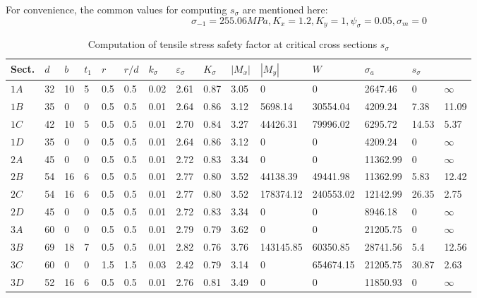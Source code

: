 \begin{landscape}
	For convenience, the common values for computing $ s_\sigma $ are mentioned here:
	\[
	\sigma_{-1} = 255.06 \unit{MPa}, K_x = 1.2, K_y = 1, \psi_\sigma = 0.05, \sigma_m = 0
	\]
	\begin{table}[ht]
		\renewcommand{\arraystretch}{1.5}
		\centering
		\caption{Computation of tensile stress safety factor at critical cross sections $ s_\sigma $}
		\begin{tabular}{lllllllllllllll}\toprule
			Sect. 	& $ d $ & $ b $ & $ t_1 $ & $ r $ & $ r/d $ & $ k_\sigma $ & $ \varepsilon_\sigma $ & $ K_\sigma $ & $ |M_x| $ & $ |M_y| $ & $ W $ & $ \sigma_a $ & $ s_\sigma $ \\ \midrule
			$ 1A $	&	32	&	10	&	5	&	0.5 & 0.5 &  0.02	&	2.61	&	0.87	&	3.05	&	0			&	0			&	2647.46		&	0			&	 $ \infty $	\\
			$ 1B $	&	35	&	0	&	0	&	0.5 & 0.5 &  0.01	&	2.64	&	0.86	&	3.12	&	5698.14		&	30554.04	&	4209.24		&	7.38		&	11.09		\\
			$ 1C $	&	42	&	10	&	5	&	0.5 & 0.5 &  0.01	&	2.70	&	0.84	&	3.27	&	44426.31	&	79996.02	&	6295.72		&	14.53		&	5.37		\\
			$ 1D $	&	35	&	0	&	0	&	0.5 & 0.5 &  0.01	&	2.64	&	0.86	&	3.12	&	0			&	0			&	4209.24		&	0			&	$ \infty $	\\
			$ 2A $	&	45	&	0	&	0	&	0.5 & 0.5 &  0.01	&	2.72	&	0.83	&	3.34	&	0			&	0			&	11362.99	&	0			&	$ \infty $	\\
			$ 2B $	&	54	&	16	&	6	&	0.5 & 0.5 &  0.01	&	2.77	&	0.80	&	3.52	&	44138.39	&	49441.98	&	11362.99	&	5.83		&	12.42		\\
			$ 2C $	&	54	&	16	&	6	&	0.5 & 0.5 &  0.01	&	2.77	&	0.80	&	3.52	&	178374.12	&	240553.02	&	12142.99	&	26.35		&	2.75		\\
			$ 2D $	&	45	&	0	&	0	&	0.5 & 0.5 &  0.01	&	2.72	&	0.83	&	3.34	&	0			&	0			&	8946.18		&	0			&	$ \infty $	\\
			$ 3A $	&	60	&	0	&	0	&	0.5 & 0.5 &  0.01	&	2.79	&	0.79	&	3.62	&	0			&	0			&	21205.75	&	0			&	$ \infty $	\\
			$ 3B $	&	69	&	18	&	7	&	0.5 & 0.5 &  0.01	&	2.82	&	0.76	&	3.76	&	143145.85	&	60350.85	&	28741.56	&	5.4			&	12.56		\\
			$ 3C $	&	60	&	0	&	0	&	1.5 & 1.5 &  0.03	&	2.42	&	0.79	&	3.14	&	0			&	654674.15	&	21205.75	&	30.87		&	2.63		\\
			$ 3D $	&	52	&	16	&	6	&	0.5 & 0.5 &  0.01	&	2.76	&	0.81	&	3.49	&	0			&	0			&	11850.93	&	0			&	$ \infty $	\\
			\bottomrule
		\end{tabular}
		\label{safety-sigma}
	\end{table}
\end{landscape}

